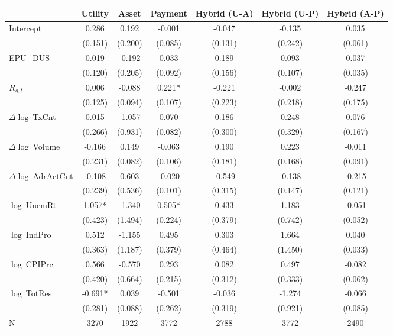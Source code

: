 \begin{table}[ht]
\centering
\scriptsize
\setlength{\tabcolsep}{4pt}
\begin{tabular}{l *{6}{c}}
\toprule
 & Utility & Asset & Payment & Hybrid (U-A) & Hybrid (U-P) & Hybrid (A-P) \\
\midrule
Intercept & 0.286 & 0.192 & -0.001 & -0.047 & -0.135 & 0.035 \\
 & (0.151) & (0.200) & (0.085) & (0.131) & (0.242) & (0.061) \\
\addlinespace
EPU_DUS & 0.019 & -0.192 & 0.033 & 0.189 & 0.093 & 0.037 \\
 & (0.120) & (0.205) & (0.092) & (0.156) & (0.107) & (0.035) \\
\addlinespace
$R_{g,t}$ & 0.006 & -0.088 & 0.221* & -0.221 & -0.002 & -0.247 \\
 & (0.125) & (0.094) & (0.107) & (0.223) & (0.218) & (0.175) \\
\addlinespace
$\Delta\log\ $TxCnt & 0.015 & -1.057 & 0.070 & 0.186 & 0.248 & 0.076 \\
 & (0.266) & (0.931) & (0.082) & (0.300) & (0.329) & (0.167) \\
\addlinespace
$\Delta\log\ $Volume & -0.166 & 0.149 & -0.063 & 0.190 & 0.223 & -0.011 \\
 & (0.231) & (0.082) & (0.106) & (0.181) & (0.168) & (0.091) \\
\addlinespace
$\Delta\log\ $AdrActCnt & -0.108 & 0.603 & -0.020 & -0.549 & -0.138 & -0.215 \\
 & (0.239) & (0.536) & (0.101) & (0.315) & (0.147) & (0.121) \\
\addlinespace
$\log\ $UnemRt & 1.057* & -1.340 & 0.505* & 0.433 & 1.183 & -0.051 \\
 & (0.423) & (1.494) & (0.224) & (0.379) & (0.742) & (0.052) \\
\addlinespace
$\log\ $IndPro & 0.512 & -1.155 & 0.495 & 0.303 & 1.664 & 0.040 \\
 & (0.363) & (1.187) & (0.379) & (0.464) & (1.450) & (0.033) \\
\addlinespace
$\log\ $CPIPrc & 0.566 & -0.570 & 0.293 & 0.082 & 0.497 & -0.082 \\
 & (0.420) & (0.664) & (0.215) & (0.312) & (0.333) & (0.062) \\
\addlinespace
$\log\ $TotRes & -0.691* & 0.039 & -0.501 & -0.036 & -1.274 & -0.066 \\
 & (0.281) & (0.088) & (0.262) & (0.319) & (0.921) & (0.085) \\
\addlinespace
\midrule
N & 3270 & 1922 & 3772 & 2788 & 3772 & 2490 \\

\end{tabular}
\end{table}
